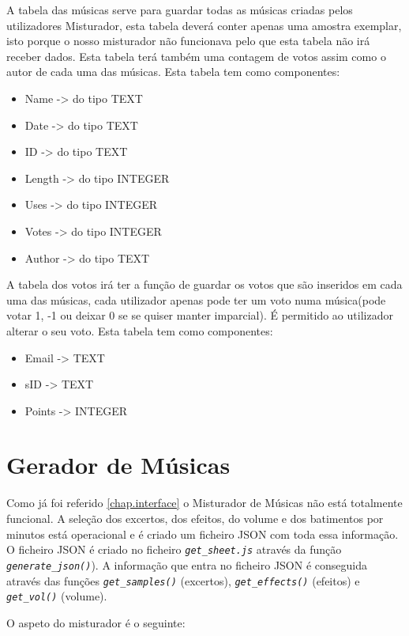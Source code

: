 \documentclass{report}
\begin{document}
A tabela das músicas serve para guardar todas as músicas criadas pelos utilizadores Misturador, esta tabela deverá conter apenas uma amostra exemplar, isto porque o nosso misturador não funcionava pelo que esta tabela não irá receber dados.
Esta tabela terá também uma contagem de votos assim como o autor de cada uma das músicas.
Esta tabela tem como componentes:
	\begin{itemize}
		\item Name -> do tipo TEXT
		\item Date -> do tipo TEXT
		\item ID -> do tipo TEXT
		\item Length -> do tipo INTEGER
		\item Uses -> do tipo INTEGER
		\item Votes -> do tipo INTEGER
		\item Author -> do tipo TEXT
	\end{itemize}

A tabela dos votos irá ter a função de guardar os votos que são inseridos em cada uma das músicas, cada utilizador apenas pode ter um voto numa música(pode votar 1, -1 ou deixar 0 se se quiser manter imparcial).
É permitido ao utilizador alterar o seu voto.
Esta tabela tem como componentes:
	\begin{itemize}
		\item Email -> TEXT
		\item sID -> TEXT
		\item Points -> INTEGER
	\end{itemize}

\newpage

\section{Gerador de Músicas}
\label{chap.gerador}
Como já foi referido \autoref{chap.interface} o Misturador de Músicas não está totalmente funcional. A seleção dos excertos, dos efeitos, do volume e dos batimentos por minutos está operacional e é criado um ficheiro JSON com toda essa informação. O ficheiro JSON é criado no ficheiro \textit{\texttt{get\_sheet.js}} através da função \textit{\texttt{generate\_json()}}). A informação que entra no ficheiro JSON é conseguida através das funções \textit{\texttt{get\_samples()}} (excertos), \textit{\texttt{get\_effects()}} (efeitos) e \textit{\texttt{get\_vol()}} (volume).

O aspeto do misturador é o seguinte:
\end{document}
